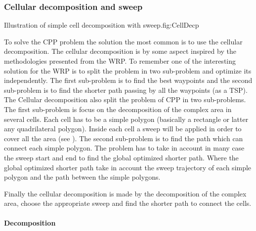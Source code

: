 \subsubsection{ Cellular decomposition and sweep}
\begin{mfigures}[!]{ Illustration  of  simple cell decomposition with sweep.}{fig:CellDecp} \centering
{}

\end{mfigures}	
To solve the CPP problem the solution the most common is to use the cellular decomposition. The cellular decomposition is by some aspect inspired by the methodologies presented from the WRP.
To remember one of the interesting solution for the WRP  is to split the problem in two sub-problem and optimize its independently. The first sub-problem is to find the best waypoints and the second sub-problem is to find the shorter path passing by all the waypoints (as a TSP).
 The Cellular decomposition also split the problem of CPP in two sub-problems. The first sub-problem is focus on the decomposition of the complex area in several cells.  Each cell has to be a simple polygon (basically a rectangle or latter any quadrilateral polygon). Inside each cell a sweep will be applied in order to cover all the area (see ). The second sub-problem is to find the path which can connect each simple polygon. The problem has to take in account in many case the sweep start and end to find the global optimized shorter path. Where the global optimized shorter path take in account the sweep trajectory of each simple polygon and the path between the simple polygons.
 
 Finally the cellular decomposition is made by the decomposition of the complex area, choose the appropriate sweep and find the shorter path to connect the cells. 
 
 \paragraph*{Decomposition}\label{par:decomposition}

